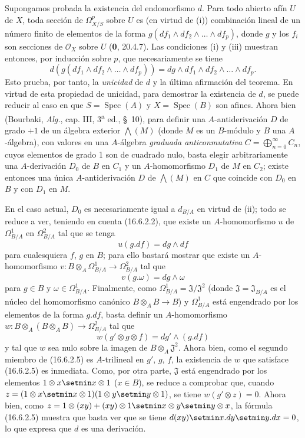 Supongamos probada la existencia del endomorfismo $d$. Para todo abierto afín
$U$ de $X$, toda sección de $\varOmega_{X/S}^p$ sobre $U$ es (en virtud
de (i)) combinación lineal de un número finito de elementos de la forma
$g(df_1\wedge df_2\wedge\ldots\wedge df_p)$, donde $g$ y los $f_i$ son
secciones de $\mathcal{O}_X$ sobre $U$ (\textbf 0, 20.4.7). Las condiciones (i)
y (iii) muestran entonces, por inducción sobre $p$, que necesariamente se tiene
\[
  d(g(df_1\wedge df_2\wedge\ldots\wedge df_p))
  =dg\wedge df_1\wedge df_2\wedge\ldots\wedge df_p.
  \tag{16.6.2.2}
  \label{IV.16.6.2.2}
\]
Esto prueba, por tanto, la \emph{unicidad} de $d$ y la última afirmación del teorema.
En virtud de esta propiedad de unicidad, para demostrar la existencia de $d$, se
puede reducir al caso en que $S=\operatorname{Spec}(A)$ y
$X=\operatorname{Spec}(B)$ son afines. Ahora bien (Bourbaki, \emph{Alg.}, cap.
III, 3\textsuperscript{a} ed., \S~10), para definir una $A$-antiderivación
$D$ de grado $+1$ de un álgebra exterior $\bigwedge(M)$ (donde $M$ es un
$B$-módulo y $B$ una $A$-álgebra), con valores en una
$A$-álgebra \emph{graduada anticonmutativa}
$C=\bigoplus_{n=0}^{\infty}C_n$, cuyos elementos de grado 1 son de cuadrado
nulo, basta elegir arbitrariamente una $A$-derivación $D_0$ de $B$
en $C_1$ y un $A$-homomorfismo $D_1$ de $M$ en $C_2$; existe entonces
una única $A$-antiderivación $D$ de $\bigwedge(M)$ en $C$
que coincide con $D_0$ en $B$ y con $D_1$ en $M$.

En el caso actual, $D_0$ es necesariamente igual a $d_{B/A}$ en virtud de
(ii); todo se reduce a ver, teniendo en cuenta (16.6.2.2), que existe un
$A$-homomorfismo $u$ de $\Omega_{B/A}^1$ en $\Omega_{B/A}^2$ tal que
se tenga
\[
  u(g.df)=dg\wedge df
  \tag{16.6.2.3}
  \label{IV.16.6.2.3}
\]
para cualesquiera $f$, $g$ en $B$; para ello bastará mostrar que
existe un $A$-homomorfismo
$v:B\otimes_A\Omega_{B/A}^1\to\Omega_{B/A}^2$ tal que
\[
  v(g.\omega)=dg\wedge\omega
  \tag{16.6.2.4}
  \label{IV.16.6.2.4}
\]
para $g\in B$ y $\omega\in\Omega_{B/A}^1$. Finalmente, como
$\Omega_{B/A}^1=\mathfrak{J}/\mathfrak{J}^2$ (donde
$\mathfrak{J}=\mathfrak{J}_{B/A}$ es el núcleo del homomorfismo canónico
$B\otimes_A B\to B$) y $\Omega_{B/A}^1$ está engendrado por los elementos
de la forma $g.df$, basta definir un $A$-homomorfismo
$w:B\otimes_A(B\otimes_A B)\to\Omega_{B/A}^2$ tal que
\[
  w(g'\otimes g\otimes f)=dg'\wedge(g.df)
  \tag{16.6.2.5}
  \label{IV.16.6.2.5}
\]
y tal que $w$ sea nulo sobre la imagen de $B\otimes_A\mathfrak{J}^2$. Ahora bien,
como el segundo miembro de (16.6.2.5) es $A$-trilineal en $g'$, $g$, $f$,
la existencia de $w$ que satisface (16.6.2.5) es inmediata. Como, por otra parte,
$\mathfrak{J}$ está engendrado por los elementos $1\otimes x\setmin x\otimes1$
($x\in B$), se reduce a comprobar que, cuando
$z=(1\otimes x\setmin x\otimes1)(1\otimes y\setmin y\otimes1)$, se tiene
$w(g'\otimes z)=0$. Ahora bien, como
$z=1\otimes(xy)+(xy)\otimes1\setmin x\otimes y\setmin y\otimes x$, la fórmula (16.6.2.5)
muestra que
basta ver que se tiene $d(xy)\setmin x.dy\setmin y.dx=0$, lo que expresa que $d$ es una
derivación.

